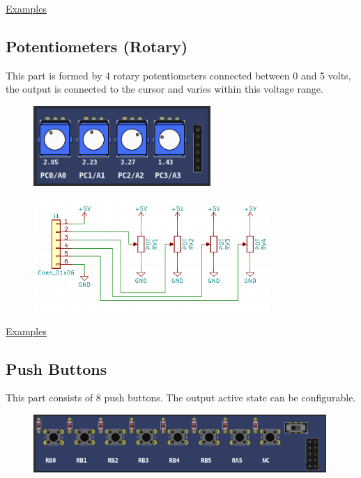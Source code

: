 \href{https://lcgamboa.github.io/picsimlab_examples/Parts.html\#Potentiometers}{Examples}

\subsection{Potentiometers (Rotary)}

This part is formed by 4 rotary potentiometers connected between 0 and 5 volts, the output is connected to the cursor and varies within this voltage range.
\begin{figure}[H]
\center
\includegraphics[width=0.6\textwidth]{img/part_pot_r.png} 
\end{figure} 

\begin{figure}[H]
\center
\includegraphics[width=0.8\textwidth]{img/part_pot_.png} 
\end{figure} 

\href{https://lcgamboa.github.io/picsimlab_examples/Parts.html\#Potentiometers_(Rotary)}{Examples}

\subsection{Push Buttons}

This part consists of 8 push buttons. The output active state can be configurable.
\begin{figure}[H]
\center
\includegraphics[width=0.99\textwidth]{img/part_buttons.png} 
\end{figure} 

